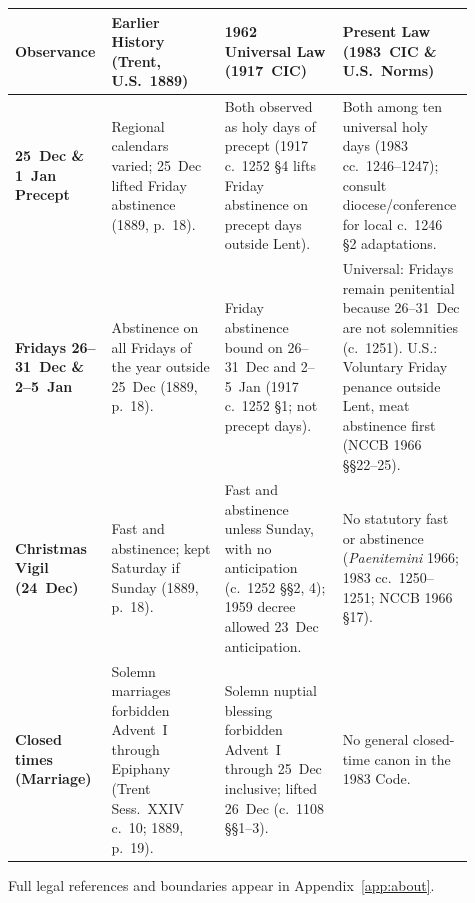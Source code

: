 {\footnotesize
\begin{longtable}{>{\raggedright\arraybackslash}p{0.17\linewidth}>{\raggedright\arraybackslash}p{0.24\linewidth}>{\raggedright\arraybackslash}p{0.25\linewidth}>{\raggedright\arraybackslash}p{0.25\linewidth}}
\toprule
\textbf{Observance} & \textbf{Earlier History (Trent, U.S.~1889)} & \textbf{1962 Universal Law (1917~CIC)} & \textbf{Present Law (1983~CIC \& U.S.~Norms)} \\
\midrule
\endhead
\textbf{25~Dec \& 1~Jan Precept} & Regional calendars varied; 25~Dec lifted Friday abstinence (1889, p.~18). & Both observed as holy days of precept (1917 c.~1252 \S 4 lifts Friday abstinence on precept days outside Lent). & Both among ten universal holy days (1983 cc.~1246--1247); consult diocese/conference for local c.~1246 \S 2 adaptations. \\
\textbf{Fridays 26--31~Dec \& 2--5~Jan} & Abstinence on all Fridays of the year outside 25~Dec (1889, p.~18). & Friday abstinence bound on 26--31~Dec and 2--5~Jan (1917 c.~1252 \S 1; not precept days). & Universal: Fridays remain penitential because 26--31~Dec are not solemnities (c.~1251). U.S.: Voluntary Friday penance outside Lent, meat abstinence first (NCCB 1966 \S\S 22--25). \\
\textbf{Christmas Vigil (24~Dec)} & Fast and abstinence; kept Saturday if Sunday (1889, p.~18). & Fast and abstinence unless Sunday, with no anticipation (c.~1252 \S\S 2, 4); 1959 decree allowed 23~Dec anticipation. & No statutory fast or abstinence (\textit{Paenitemini} 1966; 1983 cc.~1250--1251; NCCB 1966 \S 17). \\
\textbf{Closed times (Marriage)} & Solemn marriages forbidden Advent~I through Epiphany (Trent Sess.~XXIV c.~10; 1889, p.~19). & Solemn nuptial blessing forbidden Advent~I through 25~Dec inclusive; lifted 26~Dec (c.~1108 \S\S 1--3). & No general closed-time canon in the 1983 Code. \\
\bottomrule
\end{longtable}
}

Full legal references and boundaries appear in Appendix~\ref{app:about}.
